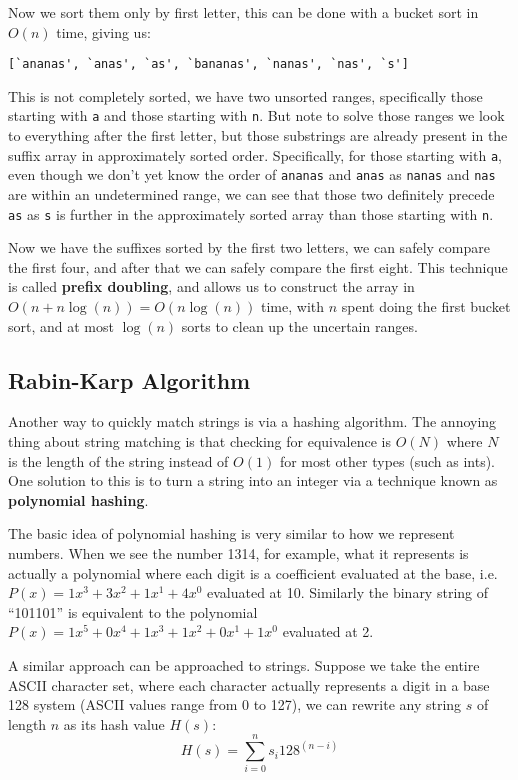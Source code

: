 \documentclass[12 pt, twoside] {article}
\begin{document}
{Now we sort them only by first letter, this can be done with a bucket sort in
$O(n)$ time, giving us:
\begin{verbatim}
[`ananas', `anas', `as', `bananas', `nanas', `nas', `s']
\end{verbatim}

This is not completely sorted, we have two unsorted ranges, specifically those
starting with \texttt{a} and those starting with \texttt{n}. But note to solve
those ranges we look to everything after the first letter, but those substrings
are already present in the suffix array in approximately sorted order.
Specifically, for those starting with \texttt{a}, even though we don't yet know
the order of \texttt{ananas} and \texttt{anas} as \texttt{nanas} and
\texttt{nas} are within an undetermined range, we can see that those two
definitely precede \texttt{as} as \texttt{s} is further in the approximately
sorted array than those starting with \texttt{n}.

Now we have the suffixes sorted by the first two letters, we can safely compare
the first four, and after that we can safely compare the first eight. This
technique is called \textbf{prefix doubling}, and allows us to construct the
array in $O(n + n \log(n)) = O(n \log(n))$ time, with $n$ spent doing the first
bucket sort, and at most $\log(n)$ sorts to clean up the uncertain ranges.

\subsection*{Rabin-Karp Algorithm}

Another way to quickly match strings is via a hashing algorithm. The annoying
thing about string matching is that checking for equivalence is $O(N)$ where $N$
is the length of the string instead of $O(1)$ for most other types (such as
ints). One solution to this is to turn a string into an integer via a technique
known as \textbf{polynomial hashing}.

The basic idea of polynomial hashing is very similar to how we represent
numbers. When we see the number 1314, for example, what it represents is
actually a polynomial where each digit is a coefficient evaluated at the base,
i.e. $P(x) = 1  x^3 + 3  x^2 + 1  x^1 + 4  x^0$ evaluated at
10. Similarly the binary string of ``101101'' is equivalent to the polynomial
$P(x) = 1 x^5 + 0 x^4 + 1 x^3 + 1 x^2 + 0x^1 + 1 x^0$ evaluated at 2.

A similar approach can be approached to strings. Suppose we take the entire
ASCII character set, where each character actually represents a digit in a base
128 system (ASCII values range from 0 to 127), we can rewrite any string $s$ of
length $n$ as its hash value $H(s)$:
\[
    H(s) = \sum_{i=0}^n s_i 128^{(n - i)}
\]

}
\end{document}
